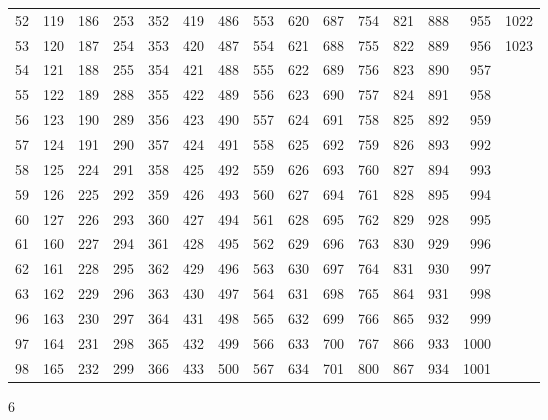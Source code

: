\documentclass{assignment}
\begin{document}
\begin{tabular}{r r r r r r r r r r r r r r r}
52 & 119 & 186 & 253 & 352 & 419 & 486 & 553 & 620 & 687 & 754 & 821 & 888 & 955 & 1022 \\
53 & 120 & 187 & 254 & 353 & 420 & 487 & 554 & 621 & 688 & 755 & 822 & 889 & 956 & 1023 \\
54 & 121 & 188 & 255 & 354 & 421 & 488 & 555 & 622 & 689 & 756 & 823 & 890 & 957 \\
55 & 122 & 189 & 288 & 355 & 422 & 489 & 556 & 623 & 690 & 757 & 824 & 891 & 958 \\
56 & 123 & 190 & 289 & 356 & 423 & 490 & 557 & 624 & 691 & 758 & 825 & 892 & 959 \\
57 & 124 & 191 & 290 & 357 & 424 & 491 & 558 & 625 & 692 & 759 & 826 & 893 & 992 \\
58 & 125 & 224 & 291 & 358 & 425 & 492 & 559 & 626 & 693 & 760 & 827 & 894 & 993 \\
59 & 126 & 225 & 292 & 359 & 426 & 493 & 560 & 627 & 694 & 761 & 828 & 895 & 994 \\
60 & 127 & 226 & 293 & 360 & 427 & 494 & 561 & 628 & 695 & 762 & 829 & 928 & 995 \\
61 & 160 & 227 & 294 & 361 & 428 & 495 & 562 & 629 & 696 & 763 & 830 & 929 & 996 \\
62 & 161 & 228 & 295 & 362 & 429 & 496 & 563 & 630 & 697 & 764 & 831 & 930 & 997 \\
63 & 162 & 229 & 296 & 363 & 430 & 497 & 564 & 631 & 698 & 765 & 864 & 931 & 998 \\
96 & 163 & 230 & 297 & 364 & 431 & 498 & 565 & 632 & 699 & 766 & 865 & 932 & 999 \\
97 & 164 & 231 & 298 & 365 & 432 & 499 & 566 & 633 & 700 & 767 & 866 & 933 & 1000 \\
98 & 165 & 232 & 299 & 366 & 433 & 500 & 567 & 634 & 701 & 800 & 867 & 934 & 1001 \\
\end{tabular}
\newpage


6\\
\\
\end{document}
